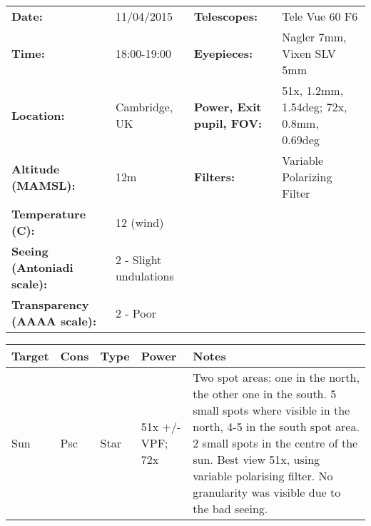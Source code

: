 \begin{tabular}{ p{1.7in} p{1.2in} p{1.5in} p{4.2in}}
{\bf Date:} & 11/04/2015 & {\bf Telescopes:} & Tele Vue 60 F6 \\ 
{\bf Time:} & 18:00-19:00 & {\bf Eyepieces:} & Nagler 7mm, Vixen SLV 5mm \\ 
{\bf Location:} & Cambridge, UK & {\bf Power, Exit pupil, FOV:} & 51x, 1.2mm, 1.54deg; 72x, 0.8mm, 0.69deg \\ 
{\bf Altitude (MAMSL):} & 12m & {\bf Filters:} & Variable Polarizing Filter \\ 
{\bf Temperature (C):} & 12 (wind) & & \\ 
{\bf Seeing (Antoniadi scale):} & 2 - Slight undulations & & \\ 
{\bf Transparency (AAAA scale):} & 2 - Poor & & \\ 
\end{tabular}
\centering 
\begin{longtable}{ p{0.8in}  p{0.3in}  p{0.5in}  p{0.9in}  p{5.8in} }
\hline 
{\bf Target} & {\bf Cons} & {\bf Type} & {\bf Power} & {\bf Notes} \\ 
\hline 
Sun & Psc & Star & 51x +/- VPF; 72x & Two spot areas: one in the north, the other one in the south. 5 small spots where visible in the north, 4-5 in the south spot area. 2 small spots in the centre of the sun. Best view 51x, using variable polarising filter. No granularity was visible due to the bad seeing. \\ 
\hline 
\end{longtable} 
